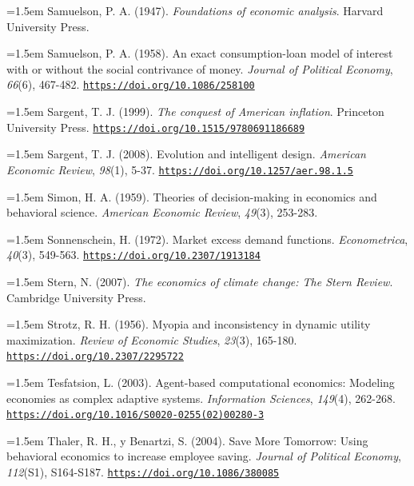\documentclass[10pt,a4paper]{article}
\begin{document}
\noindent\hangindent=1.5em Samuelson, P. A. (1947). \textit{Foundations of economic analysis}. Harvard University Press.

\noindent\hangindent=1.5em Samuelson, P. A. (1958). An exact consumption-loan model of interest with or without the social contrivance of money. \textit{Journal of Political Economy}, \textit{66}(6), 467-482. \href{https://doi.org/10.1086/258100}{\nolinkurl{https://doi.org/10.1086/258100}}

\noindent\hangindent=1.5em Sargent, T. J. (1999). \textit{The conquest of American inflation}. Princeton University Press. \href{https://doi.org/10.1515/9780691186689}{\nolinkurl{https://doi.org/10.1515/9780691186689}}

\noindent\hangindent=1.5em Sargent, T. J. (2008). Evolution and intelligent design. \textit{American Economic Review}, \textit{98}(1), 5-37. \href{https://doi.org/10.1257/aer.98.1.5}{\nolinkurl{https://doi.org/10.1257/aer.98.1.5}}

\noindent\hangindent=1.5em Simon, H. A. (1959). Theories of decision-making in economics and behavioral science. \textit{American Economic Review}, \textit{49}(3), 253-283.

\noindent\hangindent=1.5em Sonnenschein, H. (1972). Market excess demand functions. \textit{Econometrica}, \textit{40}(3), 549-563. \href{https://doi.org/10.2307/1913184}{\nolinkurl{https://doi.org/10.2307/1913184}}

\noindent\hangindent=1.5em Stern, N. (2007). \textit{The economics of climate change: The Stern Review}. Cambridge University Press.

\noindent\hangindent=1.5em Strotz, R. H. (1956). Myopia and inconsistency in dynamic utility maximization. \textit{Review of Economic Studies}, \textit{23}(3), 165-180. \href{https://doi.org/10.2307/2295722}{\nolinkurl{https://doi.org/10.2307/2295722}}

\noindent\hangindent=1.5em Tesfatsion, L. (2003). Agent-based computational economics: Modeling economies as complex adaptive systems. \textit{Information Sciences}, \textit{149}(4), 262-268. \href{https://doi.org/10.1016/S0020-0255(02)00280-3}{\nolinkurl{https://doi.org/10.1016/S0020-0255(02)00280-3}}

\noindent\hangindent=1.5em Thaler, R. H., y Benartzi, S. (2004). Save More Tomorrow: Using behavioral economics to increase employee saving. \textit{Journal of Political Economy}, \textit{112}(S1), S164-S187. \href{https://doi.org/10.1086/380085}{\nolinkurl{https://doi.org/10.1086/380085}}
\end{document}

